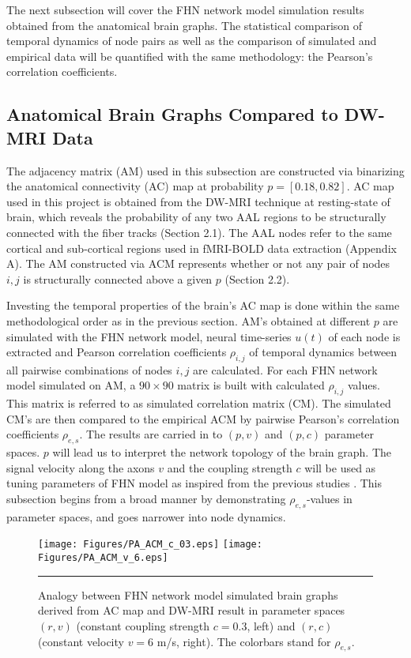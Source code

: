 The next subsection will cover the FHN network model simulation results obtained from the anatomical brain graphs. The statistical comparison of temporal dynamics of node pairs as well as the comparison of simulated and empirical data will be quantified with the same methodology: the Pearson's correlation coefficients. 

\subsection{Anatomical Brain Graphs Compared to DW-MRI Data}

The adjacency matrix (AM) used in this subsection are constructed via binarizing the anatomical connectivity (AC) map at probability $p=[0.18, 0.82]$. AC map used in this project is obtained from the DW-MRI technique at resting-state of brain, which reveals the probability of any two AAL regions to be structurally connected with the fiber tracks (Section 2.1). The AAL nodes refer to the same cortical and sub-cortical regions used in fMRI-BOLD data extraction (Appendix A). The AM constructed via ACM represents whether or not any pair of nodes $i,j$ is structurally connected above a given $p$ (Section 2.2).  

Investing the temporal properties of the brain's AC map is done within the same methodological order as in the previous section. AM's obtained at different $p$ are simulated with the FHN network model, neural time-series $u(t)$ of each node is extracted and Pearson correlation coefficients $\rho_{i,j}$ of temporal dynamics between all pairwise combinations of nodes $i,j$ are calculated. For each FHN network model simulated on AM, a $90 \times 90$ matrix is built with calculated $\rho_{i,j}$ values. This matrix is referred to as simulated correlation matrix (CM). The simulated CM's are then compared to the empirical ACM by pairwise Pearson's correlation coefficients $\rho_{e,s}$. The results are carried in to $(p,v)$ and $(p,c)$ parameter spaces. $p$ will lead us to interpret the network topology of the brain graph. The signal velocity along the axons $v$ and the coupling strength $c$ will be used as tuning parameters of FHN model as inspired from the previous studies \citep{VUK13, GHO08a}. This subsection begins from a broad manner by demonstrating $\rho_{e,s}$-values in parameter spaces, and goes narrower into node dynamics. 

\begin{figure}[htbp]
 
  \centering
    \texttt{[image: Figures/PA\_ACM\_c\_03.eps]} 
	\texttt{[image: Figures/PA\_ACM\_v\_6.eps]} 

	
    \rule{35em}{0.5pt}
  \caption[Parameter Analysis, ACM]{Analogy between FHN network model simulated brain graphs derived from AC map and DW-MRI result in parameter spaces $(r,v)$ (constant coupling strength $c=0.3$, left) and $(r,c)$ (constant velocity $v=6$ m/s, right). The colorbars stand for $\rho_{e,s}$.}
  \label{fig:Parameter Analysis, ACM}
 	
\end{figure}       

